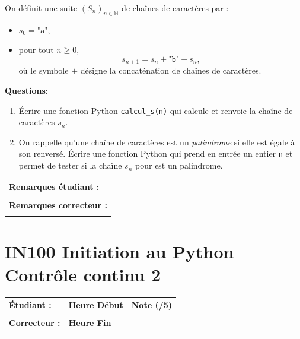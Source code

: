 \documentclass[a4paper,11pt]{article}
\begin{document}
On définit une suite $(S_n)_{n \in \mathbb{N}}$ de chaînes de caractères par :
\begin{itemize}
    \item $s_0 = \texttt{"a"}$,
    \item pour tout $n \geq 0$,
    \[
    s_{n+1} = s_n + \texttt{"b"} + s_n,
    \]
    où le symbole $+$ désigne la concaténation de chaînes de caractères.
\end{itemize}

\vspace{0.2 cm}
\textbf{Questions}: 

\begin{enumerate}
    \item Écrire une fonction Python \texttt{calcul\_s(n)} qui calcule et renvoie la chaîne de caractères $s_n$.
    \item 
    On rappelle qu’une chaîne de caractères est un \emph{palindrome} si elle est égale à son renversé.
    Écrire une fonction Python qui prend en entrée un entier \texttt{n} et permet de tester si la chaîne $s_n$ pour est un palindrome.
\end{enumerate}

\medskip




\begin{table}[h!]
\centering
\renewcommand{\arraystretch}{1.4} %
\begin{tabular}{|p{15cm}|}
\hline
\textbf{Remarques étudiant :}    \\
 \\
\hline
\textbf{Remarques correcteur :}  \\
 \\
\hline
\end{tabular}
\end{table}


\newpage


\section*{\center IN100 Initiation au Python\\
Contrôle continu 2}

\vspace{-0.3 cm}

\begin{table}[h!]
\centering
\renewcommand{\arraystretch}{1.4} %
\begin{tabular}{|p{10cm}|p{3cm}|p{2cm}|}
\hline
\textbf{Étudiant :} & \textbf{Heure Début }  & \textbf{Note (/5) }  \\
& & \\
\hline
\textbf{Correcteur :} & \textbf{Heure Fin } & \\
& & \\
\hline

\hline
\end{tabular}
\end{table}
\end{document}
